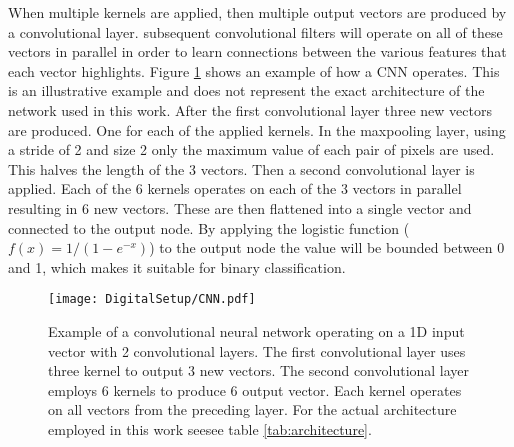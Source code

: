 \documentclass[main.tex]{subfiles}
\begin{document}
When multiple kernels are applied, then multiple output vectors are produced by a convolutional layer. subsequent convolutional filters will operate on all of these vectors in parallel in order to learn connections between the various features that each vector highlights.
Figure \ref{fig:CNN} shows an example of how a CNN operates. This is an illustrative example and does not represent the exact architecture of the network used in this work. After the first convolutional layer three new vectors are produced. One for each of the applied kernels. In the maxpooling layer, using a stride of 2 and size 2 only the maximum value of each pair of pixels are used. This halves the length of the 3 vectors. Then a second convolutional layer is applied. Each of the 6 kernels operates on each of the 3 vectors in parallel resulting in 6 new vectors. These are then flattened into a single vector and connected to the output node. By applying the logistic function ($f(x)=1/(1-e^{-x})$) to the output node the value will be bounded between 0 and 1, which makes it suitable for binary classification.

\begin{figure}[ht!]
    \centering
        \texttt{[image: DigitalSetup/CNN.pdf]}
        \caption[Example of a convolutional neural network]{Example of a convolutional neural network operating on a 1D input vector with 2 convolutional layers. The first convolutional layer uses three kernel to output 3 new vectors. The second convolutional layer employs 6 kernels to produce 6 output vector. Each kernel operates on all vectors from the preceding layer. For the actual architecture employed in this work seesee table \ref{tab:architecture}.}
    \label{fig:CNN} 
\end{figure}
\end{document}

